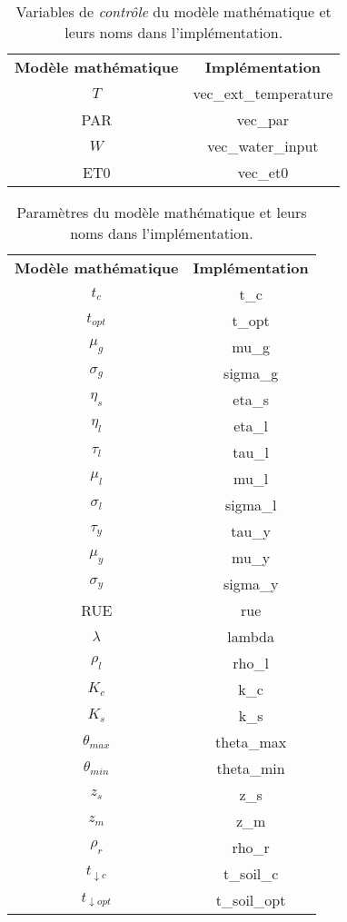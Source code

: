 \begin{table}
  \centering
  \begin{tabular}{c|c}
    \textbf{Modèle mathématique} & \textbf{Implémentation} \\
    $T$ & vec\_ext\_temperature \\
    PAR & vec\_par \\
    $W$ & vec\_water\_input \\
    ET0 & vec\_et0 \\
  \end{tabular}
  \caption{Variables de \emph{contrôle} du modèle mathématique et leurs noms
  dans l'implémentation.}
  \label{table:control_var}
\end{table}

\begin{table}
  \centering
  \begin{tabular}{c|c}
    \textbf{Modèle mathématique} & \textbf{Implémentation} \\
    $t_c$ & t\_c \\
    $t_{opt}$ & t\_opt \\
    $\mu_g$ & mu\_g \\
    $\sigma_g$ & sigma\_g \\
    $\eta_s$ & eta\_s \\
    $\eta_l$ & eta\_l \\
    $\tau_l$ & tau\_l \\
    $\mu_l$ & mu\_l \\
    $\sigma_l$ & sigma\_l \\
    $\tau_y$ & tau\_y \\
    $\mu_y$ & mu\_y \\
    $\sigma_y$ & sigma\_y \\
    RUE & rue \\
    $\lambda$ & lambda \\
    $\rho_l$ & rho\_l \\
    $K_c$ & k\_c \\
    $K_s$ & k\_s \\
    $\theta_{max}$ & theta\_max \\
    $\theta_{min}$ & theta\_min \\
    $z_s$ & z\_s \\
    $z_m$ & z\_m \\
    $\rho_r$ & rho\_r \\
    $t_{\downarrow c}$ & t\_soil\_c \\
    $t_{\downarrow opt}$ & t\_soil\_opt \\
  \end{tabular}
  \caption{Paramètres du modèle mathématique et leurs noms
  dans l'implémentation.}
  \label{table:parameters_var}
\end{table}
  




